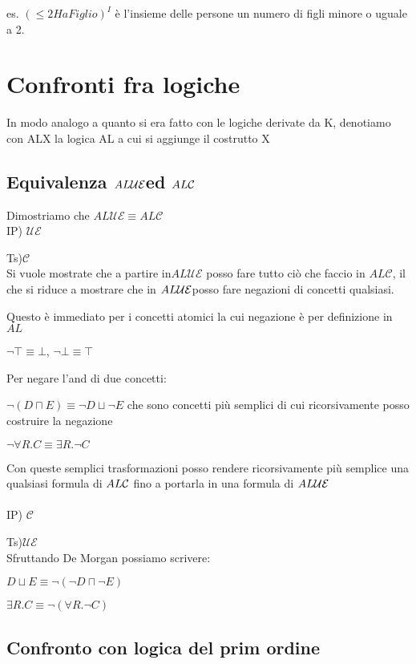 es. $(\leq2HaFiglio)^{I}$ è l'insieme delle persone un numero di
figli minore o uguale a 2.


\section{Confronti fra logiche }

In modo analogo a quanto si era fatto con le logiche derivate da K,
denotiamo con ALX la logica AL a cui si aggiunge il costrutto X


\subsection{Equivalenza $AL\mbox{\ensuremath{\mathcal{UE}}}$ed $AL\mbox{\ensuremath{\mathcal{\mathcal{C}}}}$}

Dimostriamo che $AL\mathcal{UE}\equiv AL\mathcal{C}$\\


IP) $\mathcal{UE}$

Ts)$\mathcal{C}$\\


Si vuole mostrate che a partire in$AL\mathcal{UE}$ posso fare tutto
ciò che faccio in $AL\mathcal{C}$, il che si riduce a mostrare che
in $AL\mbox{\ensuremath{\mathcal{UE}}}$posso fare negazioni di concetti qualsiasi.

Questo è immediato per i concetti atomici la cui negazione è per definizione
in $AL$

$\neg\top\equiv\bot$, $\neg\bot\equiv\top$

Per negare l'and di due concetti:

$\neg(D\sqcap E)\equiv\neg D\sqcup\neg E$ che sono concetti più semplici
di cui ricorsivamente posso costruire la negazione

$\neg\forall R.C\equiv\exists R.\neg C$

Con queste semplici trasformazioni posso rendere ricorsivamente più
semplice una qualsiasi formula di $AL\mbox{\ensuremath{\mathcal{\mathcal{C}}}}$ fino a portarla in una formula
di $AL\mbox{\ensuremath{\mathcal{UE}}}$\\
\\
IP) $\mathcal{C}$

Ts)$\mathcal{UE}$\\


Sfruttando De Morgan possiamo scrivere:

$D\sqcup E\equiv\neg(\neg D\sqcap\neg E)$

$\exists R.C\equiv\neg(\forall R.\neg C)$


\subsection{Confronto con logica del prim ordine}

